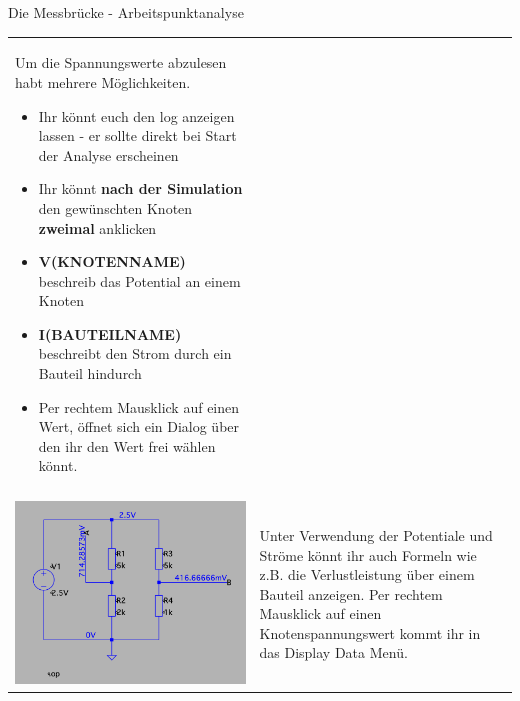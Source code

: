 \begin{frame}[t]{Die Messbrücke - Arbeitspunktanalyse}
\begin{spacing}{0.9}
\begin{tiny}
\begin{table}[h!]
\begin{tabular}{p{3cm} p{7cm}}
\begin{minipage}{.7\textwidth}
        Um die Spannungswerte abzulesen habt mehrere Möglichkeiten.
        \begin{itemize}
          \item Ihr könnt euch den log anzeigen lassen - er sollte direkt bei Start der Analyse erscheinen
          \item Ihr könnt \textbf{nach der Simulation} den gewünschten Knoten \textbf{zweimal} anklicken
          \item \textbf{V(KNOTENNAME)} beschreib das Potential an einem Knoten
          \item \textbf{I(BAUTEILNAME)} beschreibt den Strom durch ein Bauteil hindurch
          \item Per rechtem Mausklick auf einen Wert, öffnet sich ein Dialog über den ihr den Wert frei wählen könnt.
        \end{itemize}
        \end{minipage} 
        \\
        &\\
        \begin{minipage}{.3\textwidth}
         \includegraphics[width=\linewidth]{pictures/bridge_op_1.png}
       \end{minipage} 
       & 
       \begin{minipage}{.7\textwidth}
          Unter Verwendung der Potentiale und Ströme könnt ihr auch Formeln wie z.B. die Verlustleistung über einem Bauteil
          anzeigen. Per rechtem Mausklick auf einen Knotenspannungswert kommt ihr in das Display Data Menü.
          \begin{figure}

\end{figure}
\end{minipage}
\end{tabular}
\end{table}
\end{tiny}
\end{spacing}
\end{frame}
